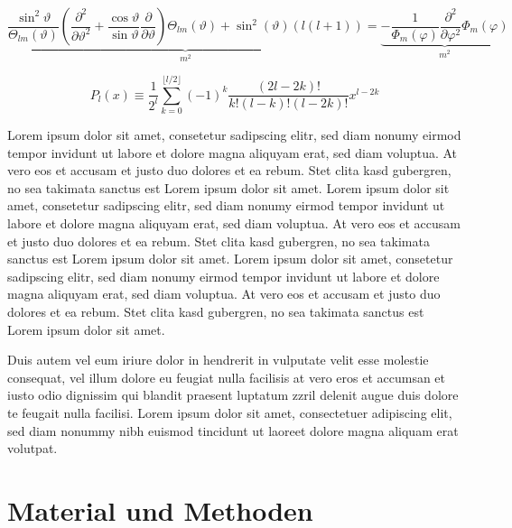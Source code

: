 \documentclass[ %
	DIV=15,
	BCOR=14mm, %
	parskip=half, %
	headsepline, %
	cleardoublepage=empty, %
	tablecaptionabove, %
	toc=bib, %
	toc=listofnumbered, %
	listof=leveldown, %
	numbers=noendperiod %
	]{scrbook}
\begin{document}
\begin{equation}
	\underbrace{\frac{\sin^{2}\vartheta}{\Theta_{lm}(\vartheta)}\left(\frac{\partial^{2}}{\partial\vartheta^{2}}+\frac{\cos\vartheta}{\sin\vartheta}\frac{\partial}{\partial\vartheta}\right)\Theta_{lm}(\vartheta)+\sin^{2}(\vartheta)(l(l+1))}_{m^{2}}=\underbrace{-\frac{1}{\Phi_{m}(\varphi)}\frac{\partial^{2}}{\partial\varphi^{2}}\Phi_{m}(\varphi)}_{m^{2}}
\end{equation}

\begin{equation}
	P_l (x)\equiv\frac {1}{2^l}\sum_{k=0}^{\lfloor l/2\rfloor} (-1)^k \frac{(2l-2k)!}{k!(l-k)!(l-2k)!} x^{l-2k}
\end{equation}

Lorem ipsum dolor sit amet, consetetur sadipscing elitr, sed diam nonumy eirmod tempor invidunt ut labore et dolore magna aliquyam erat, sed diam voluptua. At vero eos et accusam et justo duo dolores et ea rebum. Stet clita kasd gubergren, no sea takimata sanctus est Lorem ipsum dolor sit amet. Lorem ipsum dolor sit amet, consetetur sadipscing elitr, sed diam nonumy eirmod tempor invidunt ut labore et dolore magna aliquyam erat, sed diam voluptua. At vero eos et accusam et justo duo dolores et ea rebum. Stet clita kasd gubergren, no sea takimata sanctus est Lorem ipsum dolor sit amet. Lorem ipsum dolor sit amet, consetetur sadipscing elitr, sed diam nonumy eirmod tempor invidunt ut labore et dolore magna aliquyam erat, sed diam voluptua. At vero eos et accusam et justo duo dolores et ea rebum. Stet clita kasd gubergren, no sea takimata sanctus est Lorem ipsum dolor sit amet. 

Duis autem vel eum iriure dolor in hendrerit in vulputate velit esse molestie consequat, vel illum dolore eu feugiat nulla facilisis at vero eros et accumsan et iusto odio dignissim qui blandit praesent luptatum zzril delenit augue duis dolore te feugait nulla facilisi. Lorem ipsum dolor sit amet, consectetuer adipiscing elit, sed diam nonummy nibh euismod tincidunt ut laoreet dolore magna aliquam erat volutpat.



\chapter{Material und Methoden} %
\label{cha:material_und_methoden}
\end{document}
